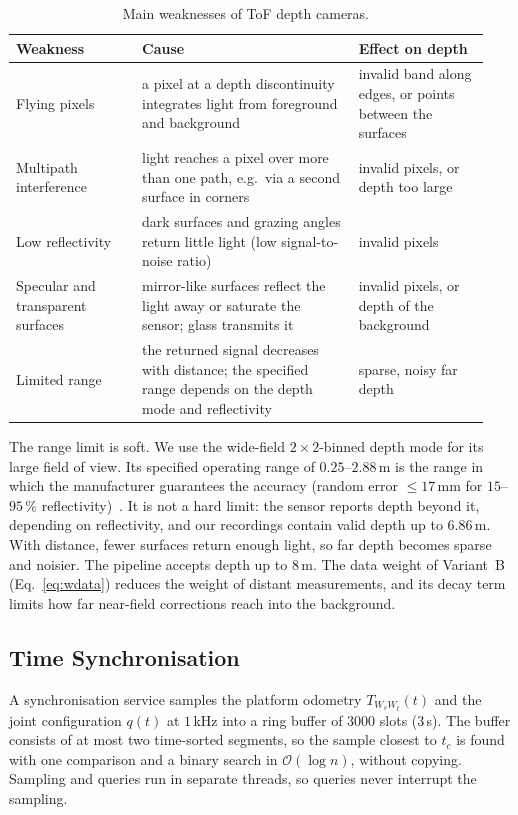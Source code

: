 \documentclass[conference]{IEEEtran}
\begin{document}
\begin{table}[t]
\centering
\caption{Main weaknesses of ToF depth cameras.}
\label{tab:tofweak}
\footnotesize
\setlength{\tabcolsep}{3pt}
\renewcommand{\arraystretch}{1.12}
\begin{tabular}{@{}>{\raggedright\arraybackslash}p{0.25\linewidth}>{\raggedright\arraybackslash}p{0.43\linewidth}>{\raggedright\arraybackslash}p{0.26\linewidth}@{}}
\toprule
Weakness & Cause & Effect on depth \\
\midrule
Flying pixels & a pixel at a depth discontinuity integrates light from
foreground and background~\cite{chugunov2021masktof} & invalid band along
edges, or points between the surfaces \\
Multipath interference & light reaches a pixel over more than one path, e.g.\
via a second surface in corners~\cite{naik2015mpi,msft2024kinectdepth} &
invalid pixels, or depth too large \\
Low reflectivity & dark surfaces and grazing angles return little light (low
signal-to-noise ratio)~\cite{msft2024kinectdepth} & invalid pixels \\
Specular and transparent surfaces & mirror-like surfaces reflect the light away
or saturate the sensor; glass transmits it~\cite{msft2024kinectdepth} & invalid
pixels, or depth of the background \\
Limited range & the returned signal decreases with distance; the specified
range depends on the depth mode and reflectivity~\cite{msft2024kinectspec} &
sparse, noisy far depth \\
\bottomrule
\end{tabular}
\end{table}

The range limit is soft. We use the wide-field \(2{\times}2\)-binned depth
mode for its large field of view. Its specified operating range of
\(0.25\)--\(2.88\,\)m is the range in which the manufacturer guarantees the
accuracy (random error \(\le17\,\)mm for \(15\)--\(95\,\%\)
reflectivity)~\cite{msft2024kinectspec}. It is not a hard limit: the sensor
reports depth beyond it, depending on reflectivity, and our recordings contain
valid depth up to \(6.86\,\)m. With distance, fewer surfaces return enough light, so far depth
becomes sparse and noisier. The pipeline accepts depth up to \(8\,\)m. The data weight of
Variant~B (Eq.~\eqref{eq:wdata}) reduces the weight of distant measurements,
and its decay term limits how far near-field corrections reach into the
background.

\subsection{Time Synchronisation}
\label{sec:sync}
A synchronisation service samples the platform odometry \(T_{W_sW_t}(t)\) and
the joint configuration \(q(t)\) at \(1\,\)kHz into a ring buffer of \(3000\)
slots (\(3\,\)s). The buffer consists of at most two time-sorted segments, so
the sample closest to \(t_c\) is found with one comparison and a binary search
in \(\mathcal{O}(\log n)\), without copying. Sampling and queries run in separate
threads, so queries never interrupt the sampling.
\end{document}
